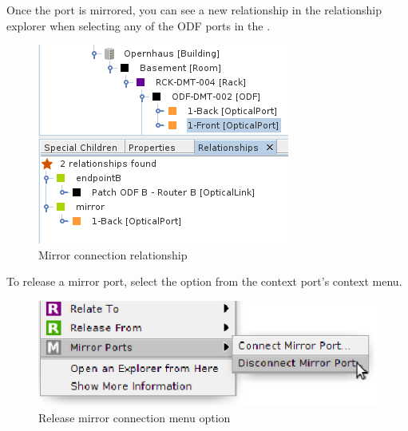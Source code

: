 \documentclass[a4paper]{article}
\begin{document}
\begin{enumerate}
					Once the port is mirrored, you can see a new relationship in the relationship explorer when selecting any of the ODF ports in the \textbf{}.
					\begin{figure}[h!]
						\centering
						\includegraphics[width=0.4\linewidth]{img/l1_example_2_mirror_connection_relationships.png}
						\caption{Mirror connection relationship}
						\label{fig:l1_example_2_mirror_connection_relationships}
					\end{figure}
					
					To release a mirror port, select the option from the context port's context menu.
					\begin{figure}[h!]
						\centering
						\includegraphics[width=0.5\linewidth]{img/l1_example_2_mirror_connection_release.png}
						\caption{Release mirror connection menu option}
						\label{fig:l1_example_2_mirror_connection_release}
					\end{figure}
			\end{enumerate}
			
\end{document}

